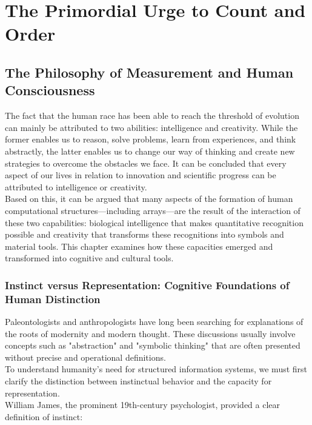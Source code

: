 
\chapter{The Primordial Urge to Count and Order}

\section{The Philosophy of Measurement and Human Consciousness}

The fact that the human race has been able to reach the threshold of evolution can mainly be attributed to two abilities: intelligence and creativity. While the former enables us to reason, solve problems, learn from experiences, and think abstractly, the latter enables us to change our way of thinking and create new strategies to overcome the obstacles we face. It can be concluded that every aspect of our lives in relation to innovation and scientific progress can be attributed to intelligence or creativity.\\
Based on this, it can be argued that many aspects of the formation of human computational structures—including arrays—are the result of the interaction of these two capabilities: biological intelligence that makes quantitative recognition possible and creativity that transforms these recognitions into symbols and material tools. This chapter examines how these capacities emerged and transformed into cognitive and cultural tools.

\subsection{Instinct versus Representation: Cognitive Foundations of Human Distinction}

Paleontologists and anthropologists have long been searching for explanations of the roots of modernity and modern thought. These discussions usually involve concepts such as "abstraction" and "symbolic thinking" that are often presented without precise and operational definitions.\\
To understand humanity's need for structured information systems, we must first clarify the distinction between instinctual behavior and the capacity for representation.\\
William James, the prominent 19th-century psychologist, provided a clear definition of instinct:

